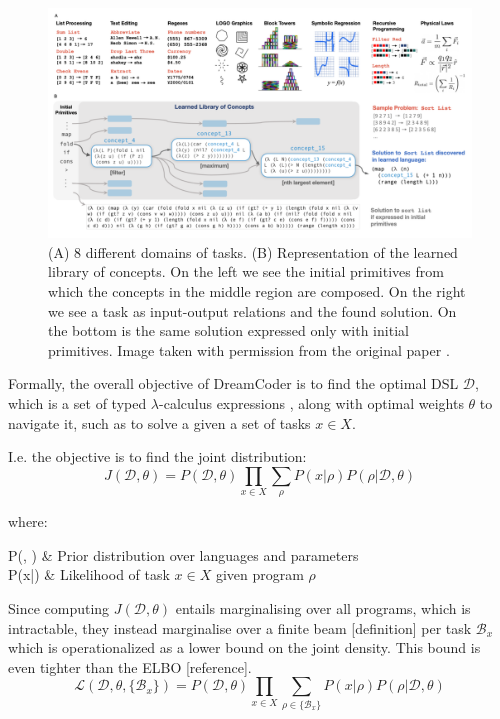 \begin{figure}[h]
    \centering
    \includegraphics[width=\textwidth]{../img/conc_library.png}
    \caption{(A) 8 different domains of tasks. (B) Representation of the learned library of concepts. On the left we see the initial primitives from which the concepts in the middle region are composed. On the right we see a task as input-output relations and the found solution. On the bottom is the same solution expressed only with initial primitives. Image taken with permission from the original paper \cite{ellis_dreamcoder_2021}.}
    \label{fig:conc_library}
\end{figure}

Formally, the overall objective of DreamCoder is to find the optimal DSL \(\mathcal{D}\), which is a set of typed \(\lambda\)-calculus expressions , along with optimal weights \( \theta \) to navigate it, such as to solve a given a set of tasks \(x \in X\).

I.e. the objective is to find the joint distribution:
\begin{equation}
    J(\mathcal{D}, \theta) = P(\mathcal{D}, \theta) \prod_{x \in X} \sum_{\rho} P(x|\rho)P(\rho|\mathcal{D},\theta) 
\end{equation}

where:
\begin{conditions*}
    P(, \theta) & Prior distribution over languages and parameters \\
    P(x|\rho) & Likelihood of task \(x \in X\) given program \(\rho\)
\end{conditions*}
Since computing \( J(\mathcal{D}, \theta) \) entails marginalising over all programs, which is intractable, they instead marginalise over a finite beam [definition] per task \( {\mathcal{B}_x} \) which is operationalized as a lower bound on the joint density. This bound is even tighter than the ELBO [reference].
\[
    \mathcal{L}(\mathcal{D}, \theta, \{\mathcal{B}_x\}) = P(\mathcal{D}, \theta) \prod_{x \in X} \sum_{\rho \in \{\mathcal{B}_x\}} P(x|\rho)P(\rho|\mathcal{D},\theta)
\]

